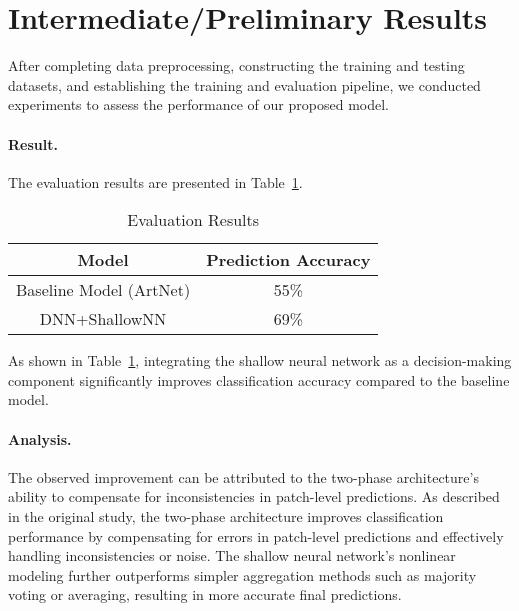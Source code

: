 \section{Intermediate/Preliminary Results}
\label{sec:results}
After completing data preprocessing, constructing the training and testing datasets, and establishing the training and evaluation pipeline, we conducted experiments to assess the performance of our proposed model.
\paragraph{Result.}The evaluation results are presented in Table~\ref{tab:evaluation_results}.
\begin{table}[h]
    
    \centering
    \begin{tabular}{c|c}
        \hline
        \textbf{Model} & \textbf{Prediction Accuracy} \\ \hline
        Baseline Model (ArtNet)       & 55\%                   \\ \hline
        DNN+ShallowNN          & 69\%                   \\ \hline
    \end{tabular}
    \caption{Evaluation Results}
    \label{tab:evaluation_results}
\end{table}

As shown in Table~\ref{tab:evaluation_results}, integrating the shallow neural network as a decision-making component significantly improves classification accuracy compared to the baseline model.
\paragraph{Analysis.}The observed improvement can be attributed to the two-phase architecture's ability to compensate for inconsistencies in patch-level predictions. 
As described in the original study\cite{imran2023artistic}, the two-phase architecture improves classification performance by compensating for errors in patch-level predictions and effectively handling inconsistencies or noise. The shallow neural network's nonlinear modeling further outperforms simpler aggregation methods such as majority voting or averaging, resulting in more accurate final predictions.
